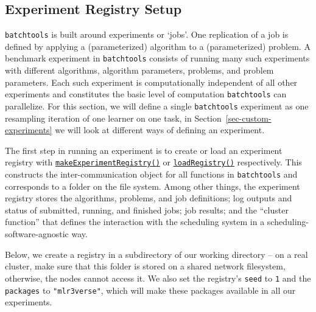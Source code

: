 \hypertarget{sec-registry}{%
\subsection{Experiment Registry Setup}\label{sec-registry}}

\texttt{batchtools} is built around
experiments or `jobs'. One replication of a job is defined
by applying a (parameterized) algorithm to a (parameterized) problem. A
benchmark experiment in \texttt{batchtools} consists of running many
such experiments with different algorithms, algorithm parameters,
problems, and problem parameters. Each such experiment is
computationally independent of all other experiments and constitutes the
basic level of computation \texttt{batchtools} can parallelize. For this
section, we will define a single \texttt{batchtools} experiment as one
resampling iteration of one learner on one task, in
Section~\ref{sec-custom-experiments} we will look at different ways of
defining an experiment.

The first step in running an experiment is to create or load an
experiment registry with
\href{https://www.rdocumentation.org/packages/batchtools/topics/makeExperimentRegistry}{\texttt{makeExperimentRegistry()}}
or
\href{https://www.rdocumentation.org/packages/batchtools/topics/loadRegistry}{\texttt{loadRegistry()}}
respectively. This constructs the inter-communication object for all
functions in \texttt{batchtools} and corresponds to a folder on the file
system. Among other things, the experiment registry stores the
algorithms, problems, and job definitions; log outputs and status of
submitted, running, and finished jobs; job results; and the ``cluster
function'' that defines the interaction with the scheduling system in a
scheduling-software-agnostic way.

Below, we create a registry in a subdirectory of our working directory
-- on a real cluster, make sure that this folder is stored on a shared
network filesystem, otherwise, the nodes cannot access it. We also set
the registry's \texttt{seed} to \texttt{1} and the \texttt{packages} to
\texttt{"mlr3verse"}, which will make these packages available in all
our experiments.

\begin{Shaded}
\begin{Highlighting}[]

\OtherTok{=} \NormalTok{(}
   \NormalTok{,}
   \NormalTok{,}
   
\NormalTok{)}
\end{Highlighting}
\end{Shaded}

